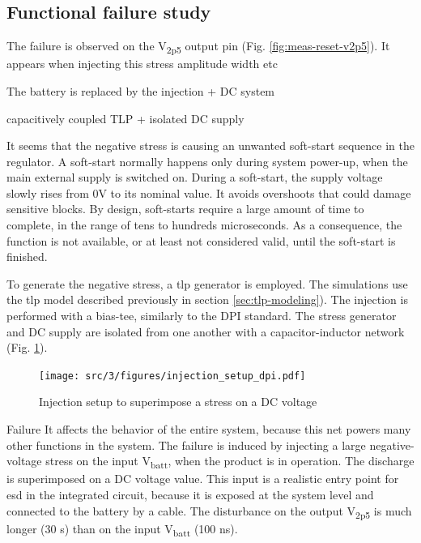 \subsection{Functional failure study}
\label{sec:failure-case-study}

The failure is observed on the V\textsubscript{2p5} output pin (Fig. \ref{fig:meas-reset-v2p5}).
It appears when injecting this stress amplitude width etc

The battery is replaced by the injection + DC system

capacitively coupled TLP + isolated DC supply

It seems that the negative stress is causing an unwanted \gls{soft-start} sequence in the regulator.
A soft-start normally happens only during system power-up, when the main external supply is switched on.
During a soft-start, the supply voltage slowly rises from 0V to its nominal value.
It avoids overshoots that could damage sensitive blocks.
By design, soft-starts require a large amount of time to complete, in the range of tens to hundreds microseconds.
As a consequence, the function is not available, or at least not considered valid, until the soft-start is finished.

To generate the negative stress, a \gls{tlp} generator is employed.
The simulations use the \gls{tlp} model described previously in section \ref{sec:tlp-modeling}).
The injection is performed with a \gls{bias-tee}, similarly to the DPI standard.
The stress generator and DC supply are isolated from one another with a capacitor-inductor network (Fig. \ref{fig:injection-setup-dpi}).

\begin{figure}[!h]
  \centering
  \texttt{[image: src/3/figures/injection\_setup\_dpi.pdf]}
  \caption{Injection setup to superimpose a stress on a DC voltage}
  \label{fig:injection-setup-dpi}
\end{figure}

Failure It affects the behavior of the entire system, because this net powers many other functions in the system.
The failure is induced by injecting a large negative-voltage stress on the input V\textsubscript{batt}, when the product is in operation.
The discharge is superimposed on a DC voltage value.
This input is a realistic entry point for \gls{esd} in the integrated circuit, because it is exposed at the system level and connected to the battery by a cable.
The disturbance on the output V\textsubscript{2p5} is much longer (30 \textmu{}s) than on the input V\textsubscript{batt} (100 ns).

